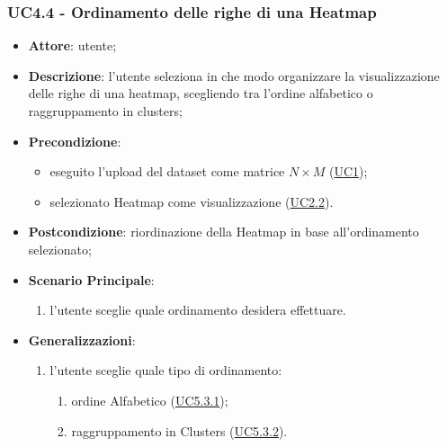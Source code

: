     \subsubsection{UC4.4 - Ordinamento delle righe di una Heatmap}
    \label{uc4.4}
    \begin{itemize}
    \item \textbf{Attore}: utente;
    \item \textbf{Descrizione}: l'utente seleziona in che modo organizzare la visualizzazione delle righe di una heatmap, scegliendo tra l'ordine alfabetico o raggruppamento in clusters;
    \item \textbf{Precondizione}: 
    \begin{itemize}
        \item eseguito l'upload del dataset come matrice $N\times M$ (\hyperref[uc1]{UC1});
        \item selezionato Heatmap come visualizzazione (\hyperref[uc2.2]{UC2.2}).
    \end{itemize}  
    \item \textbf{Postcondizione}: riordinazione della Heatmap in base all'ordinamento selezionato;
    \item \textbf{Scenario Principale}: 
    \begin{enumerate}
        \item l'utente sceglie quale ordinamento desidera effettuare.
    \end{enumerate}  
    \item \textbf{Generalizzazioni}: 
     \begin{enumerate}
            \item l'utente sceglie quale tipo di ordinamento:
                \begin{enumerate}
                    \item ordine Alfabetico (\hyperref[uc5.3.1]{UC5.3.1});
                    \item raggruppamento in Clusters (\hyperref[uc5.3.2]{UC5.3.2}).
                    \end{enumerate}
        \end{enumerate} 
    \end{itemize}
    
